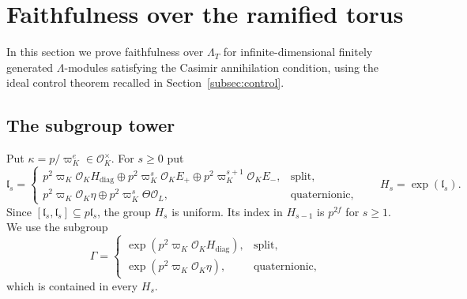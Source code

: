 \documentclass[11pt]{article}
\numberwithin{equation}{section}
\theoremstyle{definition}
\theoremstyle{remark}
\newcommand{\cO}{\mathcal O}
\begin{document}
\section{Faithfulness over the ramified torus}\label{sec:faithfulness}

In this section we prove faithfulness over $\Lambda_T$ for
infinite-dimensional finitely generated $\Lambda$-modules satisfying
the Casimir annihilation condition, using the ideal control theorem
recalled in Section~\ref{subsec:control}.

\subsection{The subgroup tower}\label{subsec:casimir-tower}

Put $\kappa=p/\varpi_K^e\in\cO_K^\times$.
For $s\geq0$ put
\[
 \mathfrak l_s=
 \begin{cases}
 p^2\varpi_K\cO_K H_{\mathrm{diag}}\oplus p^2\varpi_K^s\cO_K E_+
      \oplus p^2\varpi_K^{s+1}\cO_K E_-,&\text{split},\\
 p^2\varpi_K\cO_K\eta\oplus
      p^2\varpi_K^s\Theta\cO_L,&\text{quaternionic},
 \end{cases}
 \qquad H_s=\exp(\mathfrak l_s).
\]
Since $[\mathfrak l_s,\mathfrak l_s]\subseteq p\mathfrak l_s$,
the group $H_s$ is uniform. Its index in $H_{s-1}$ is
$p^{2f}$ for $s\geq1$. We use the subgroup
\[
 \Gamma=\begin{cases}
  \exp(p^2\varpi_K\cO_KH_{\mathrm{diag}}),&\text{split},\\
  \exp(p^2\varpi_K\cO_K\eta),&\text{quaternionic},
 \end{cases}
\]
which is contained in every $H_s$.
\end{document}
